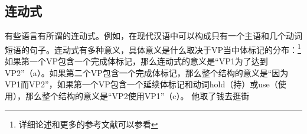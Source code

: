 \begin{exe}
\begin{xlist}[iv.]
\begin{exe}
\begin{xlist}[iv.]
\subsection{连动式}
有些语言有所谓的连动式。例如，在现代汉语中可以构成只有一个主语和几个动词短语的句子\citep[\S~21]{LT81a}。连动式有多种意义，具体意义是什么取决于VP当中体标记的分布：\footnote{%
  详细论述和更多的参考文献可以参看
} 
如果第一个VP包含一个完成体标记，那么连动式的意义是“VP1为了达到VP2”（a）。如果第二个VP包含一个完成体标记，那么整个结构的意义是“因为VP1而VP2”，如果第一个VP包含一个延续体标记和动词hold（持）或use（使用），那么整个结构的意义是“VP2使用VP1”（c）。
\eal
\ex
     他取了钱去逛街 \\



\end{xlist}
\end{exe}
\end{xlist}
\end{exe}
